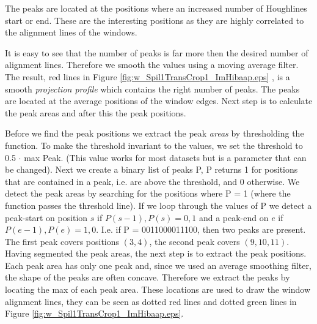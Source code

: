 The peaks are located at the positions where an increased number of Houghlines
start or end.  These are the interesting positions as they are highly correlated
to the alignment lines of the windows. 

It is easy to see that the number of peaks is far more then the desired number of alignment lines.
Therefore we smooth the values using a moving average filter.
The result, red lines in Figure \ref{fig:w_Spil1TransCrop1_ImHibaap.eps}
, is a smooth \emph{projection profile} which contains the right number of peaks. The peaks
are located at the average positions of the window edges. Next step is to
calculate the peak areas and after this the peak positions. 

Before we find the peak positions we extract the peak \emph{areas} by thresholding the
function. To make the threshold invariant to the values, we set the threshold to 0.5 $\cdot$ max Peak. 
(This value works for most datasets but is a parameter that can be changed).
Next we create a binary list of peaks P, P returns 1 for positions that are contained in
a peak, i.e. are above the threshold, and 0 otherwise.
We detect the peak areas by searching for the positions where P = 1
(where the function passes the threshold line). 
If we loop through the values of P we detect a peak-start on position $s$ if ${P(s-1),P(s)}={0,1}$
and a peak-end on $e$ if ${P(e-1),P(e)}={1,0}$. 
I.e. if P = 0011000011100, then two peaks are present. The first peak covers positions $(3,4)$, 
the second peak covers $(9,10,11)$.\\

Having segmented the peak areas, the next step is to extract the peak positions. 
Each peak area has only one peak and, since we used an average smoothing filter, the shape of 
the peaks are often concave. Therefore we extract the peaks by locating the max of each peak area. 
These locations are used to draw the window alignment lines, they can be seen
as dotted red lines and dotted green lines in Figure \ref{fig:w_Spil1TransCrop1_ImHibaap.eps}.


